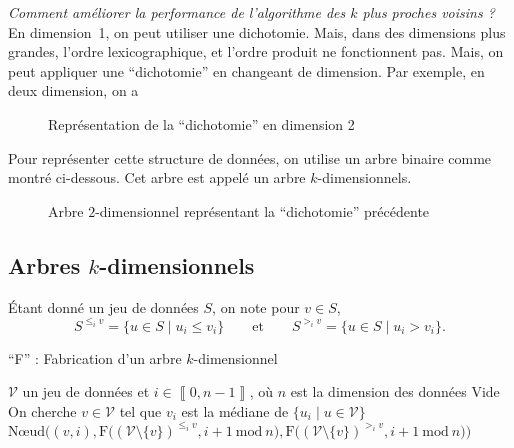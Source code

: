 {\slshape Comment améliorer la performance de l'algorithme des $k$\/ plus proches voisins ?} En dimension~1, on peut utiliser une dichotomie. Mais, dans des dimensions plus grandes, l'ordre lexicographique, et l'ordre produit ne fonctionnent pas. Mais, on peut appliquer une ``dichotomie'' en changeant de dimension. Par exemple, en deux dimension, on a 

\begin{figure}[H]
	\centering
	\caption{Représentation de la ``dichotomie'' en dimension 2}
\end{figure}

Pour représenter cette structure de données, on utilise un arbre binaire comme montré ci-dessous. Cet arbre est appelé un arbre $k$-dimensionnels.

\begin{figure}[H]
	\centering
	\caption{Arbre $2$-dimensionnel représentant la ``dichotomie'' précédente}
\end{figure}

\subsection{Arbres $k$-dimensionnels}

\begin{rmk}[Notations]
	Étant donné un jeu de données $S$, on note pour $v \in S$,\[
		S^{\le_i v} = \{u \in S  \mid u_i \le v_i\}\qquad\text{et}\qquad
		S^{>_i v} = \{u \in S  \mid u_i > v_i\}
	.\]
\end{rmk}

\begin{algorithm}[H]
	\centering
	\caption{``F'' : Fabrication d'un arbre $k$-dimensionnel}
	\begin{algorithmic}[1]
		\Entree $\mathcal{V}$\/ un jeu de données et $i \in \left\llbracket 0,n-1 \right\rrbracket$, où $n$\/ est la dimension des données
		\State\Return Vide
		\Else
		\State On cherche $v \in \mathcal{V}$\/ tel que $v_i$\/ est la médiane de $\{ u_i  \mid u \in \mathcal{V}\}$\/ 
		\State\Return $\text{Nœud}\Big((v,i), \text{F}\big((\mathcal{V} \setminus \{v\})^{\le_i v}, i + 1\ \mathrm{mod}\ n\big), \text{F}\big((\mathcal{V} \setminus \{v\})^{>_i v}, i+1\ \mathrm{mod}\ n\big)\Big)$
		\EndIf
	\end{algorithmic}
\end{algorithm}


